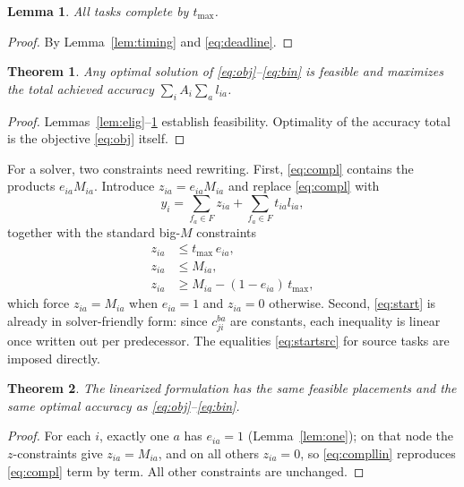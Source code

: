 \documentclass[conference]{IEEEtran}
\newtheorem{lemma}{Lemma}
\newtheorem{theorem}{Theorem}
\begin{document}
\begin{lemma}
\label{lem:deadline}
All tasks complete by $t_{\max}$.
\end{lemma}
\begin{proof}
By Lemma~\ref{lem:timing} and \eqref{eq:deadline}.
\end{proof}

\begin{theorem}
Any optimal solution of \eqref{eq:obj}--\eqref{eq:bin} is feasible and maximizes the total achieved accuracy $\sum_i A_i\sum_a l_{ia}$.
\end{theorem}
\begin{proof}
Lemmas~\ref{lem:elig}--\ref{lem:deadline} establish feasibility. Optimality of the accuracy total is the objective \eqref{eq:obj} itself.
\end{proof}

For a solver, two constraints need rewriting. First, \eqref{eq:compl} contains the products $e_{ia}M_{ia}$. Introduce $z_{ia}=e_{ia}M_{ia}$ and replace \eqref{eq:compl} with
\begin{equation}
 y_i=\sum_{f_a\in F} z_{ia}+\sum_{f_a\in F} t_{ia}l_{ia},
\label{eq:compllin}
\end{equation}
together with the standard big-$M$ constraints
\begin{align}
 z_{ia} &\le t_{\max}\, e_{ia},\\
 z_{ia} &\le M_{ia},\\
 z_{ia} &\ge M_{ia}-(1-e_{ia})\,t_{\max},
\end{align}
which force $z_{ia}=M_{ia}$ when $e_{ia}=1$ and $z_{ia}=0$ otherwise. Second, \eqref{eq:start} is already in solver-friendly form: since $c_{ji}^{ba}$ are constants, each inequality is linear once written out per predecessor. The equalities \eqref{eq:startsrc} for source tasks are imposed directly.

\begin{theorem}
The linearized formulation has the same feasible placements and the same optimal accuracy as \eqref{eq:obj}--\eqref{eq:bin}.
\end{theorem}
\begin{proof}
For each $i$, exactly one $a$ has $e_{ia}=1$ (Lemma~\ref{lem:one}); on that node the $z$-constraints give $z_{ia}=M_{ia}$, and on all others $z_{ia}=0$, so \eqref{eq:compllin} reproduces \eqref{eq:compl} term by term. All other constraints are unchanged.
\end{proof}


\balance

\end{document}
